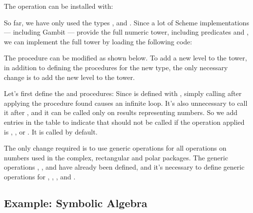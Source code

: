 \begin{exe}[2.83]
    \label{2.83}
    The  operation can be installed with:

    \begin{comp}
        So far, we have only used the types , 
         and . Since a lot of Scheme 
        implementations --- including Gambit --- provide the full numeric tower, 
        including predicates  and , we can implement 
        the full tower by loading the following code:
    \end{comp}
\end{exe}

\begin{exe}[2.84]
    The  procedure can be modified as shown below. To add 
    a new level to the tower, in addition to defining the procedures for the new 
    type, the only necessary change is to add the new level to the tower.
\end{exe}

\begin{exe}[2.85]
    Let’s first define the  and  procedures:
    Since  is defined with , simply calling 
     after applying the procedure found causes an infinite loop. It’s 
    also unnecessary to call it after , and it can be called only 
    on results representing numbers. So we add entries in the table to indicate 
    that  should not be called if the operation applied is 
    , ,  or . It is called by 
    default.
\end{exe}

\begin{exe}[2.86]
    The only change required is to use generic operations for all operations on 
    numbers used in the complex, rectangular and polar packages. The generic 
    operations , ,  and  have already 
    been defined, and it’s necessary to define generic operations for 
    , , ,  and .
\end{exe}

\subsection{Example: Symbolic Algebra}

